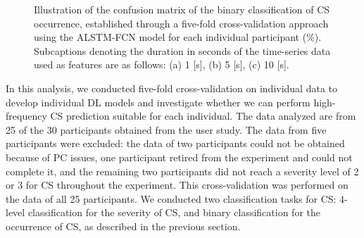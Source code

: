 \documentclass{ieeeaccess}
\begin{document}
\begin{figure}[htbp!]
    \centering
    \hfill
    \hfill
    \caption{Illustration of the confusion matrix of the binary classification of CS occurrence, established through a five-fold cross-validation approach using the ALSTM-FCN model for each individual participant (\%). Subcaptions denoting the duration in seconds of the time-series data used as features are as follows: (a) 1 [s], (b) 5 [s], (c) 10 [s].}
    \label{fig:2class}
\end{figure}


In this analysis, we conducted five-fold cross-validation on individual data to develop individual DL models and investigate whether we can perform high-frequency CS prediction suitable for each individual. The data analyzed are from 25 of the 30 participants obtained from the user study. The data from five participants were excluded: the data of two participants could not be obtained because of PC issues, one participant retired from the experiment and could not complete it, and the remaining two participants did not reach a severity level of 2 or 3 for CS throughout the experiment. This cross-validation was performed on the data of all 25 participants. We conducted two classification tasks for CS: 4-level classification for the severity of CS, and binary classification for the occurrence of CS, as described in the previous section.
\end{document}
